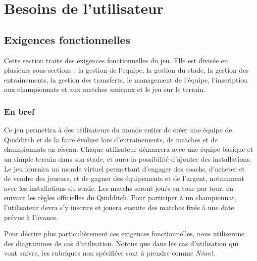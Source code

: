 \documentclass[a4paper, 11pt]{report}
\begin{document}
\renewcommand*{\glossaryname}{\section{Glossaire}}
\glsaddall
\printglossaries

\chapter{Besoins de l'utilisateur}

\section{Exigences fonctionnelles}
Cette section traite des exigences fonctionnelles du jeu. Elle est divisée en 
plusieurs sous-sections : la gestion de l'\gls{equipe}, la gestion du 
stade, la gestion des entrainements, la gestion des transferts, le management de l'équipe, l'inscription aux championnats et aux matches amicaux et le jeu sur le terrain.

\subsection{En bref}
Ce jeu permettra à des utilisateurs du monde entier de créer une équipe de 
Quidditch et de la faire évoluer lors d'entrainements, de matches et de 
championnats en réseau. Chaque utilisateur démarrera avec une équipe basique et 
un simple terrain dans son stade, et aura la possibilité d'ajouter des 
installations.
Le jeu fournira un monde virtuel permettant d'engager des \gls{coach}s, d'acheter et de vendre des \gls{joueur}s, 
et de gagner des équipements et de l'argent, notamment avec les 
installations du stade.
Les matchs seront joués en tour par tour, en suivant les règles officielles 
du Quidditch.
Pour participer à un championnat, l'utilisateur devra s'y inscrire et 
jouera ensuite des matches fixés à une date prévue à l'avance.

Pour décrire plus particulièrement ces exigences fonctionnelles, nous utiliserons des diagrammes de \gls{cas d'utilisation}. Notons que dans les cas d'utilisation qui vont suivre, les rubriques non spécifiées sont à prendre comme \textit{Néant}.

\setcounter{secnumdepth}{3}




\end{document}
